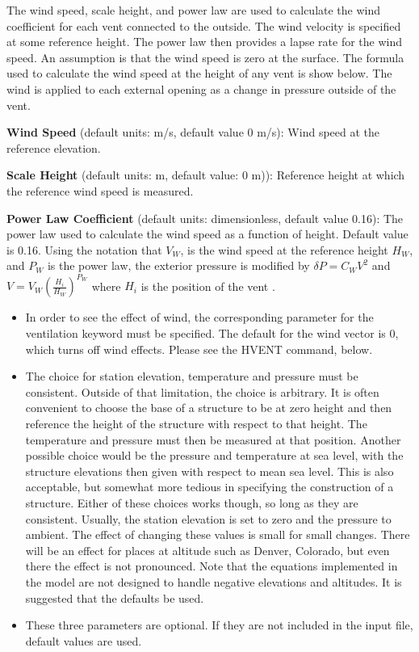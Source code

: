 The wind speed, scale height, and power law are used to calculate the wind coefficient for each vent connected to the outside.  The wind velocity is specified at some reference height.  The power law then provides a lapse rate for the wind speed.  An assumption is that the wind speed is zero at the surface.  The formula used to calculate the wind speed at the height of any vent is show below.  The wind is applied to each external opening as a change in pressure outside of the vent.

\textbf{Wind Speed} (default units: m/s, default value 0 m/s): Wind speed at the reference elevation.

\textbf{Scale Height} (default units: m, default value: 0 m)): Reference height at which the reference wind speed is measured.

\textbf{Power Law Coefficient} (default units: dimensionless, default value 0.16): The power law used to calculate the wind speed as a function of height. Default value is 0.16. Using the notation that $V_W$, is the wind speed at the reference height $H_W$, and $P_W$ is the power law, the exterior pressure is modified by  $\delta P = {C_W}{V^2}$ and $V = {V_W}{\left( {\frac{{{H_i}}}{{{H_W}}}} \right)^{{P_W}}}$ where $H_i$ is the position of the vent \cite{CFAST_Tech_Guide_6}.

\begin{itemize}
\item In order to see the effect of wind, the corresponding parameter for the ventilation keyword must be specified. The default for the wind vector is 0, which turns off wind effects. Please see the HVENT command, below.

\item The choice for station elevation, temperature and pressure must be consistent.  Outside of that limitation, the choice is arbitrary.  It is often convenient to choose the base of a structure to be at zero height and then reference the height of the structure with respect to that height.  The temperature and pressure must then be measured at that position.  Another possible choice would be the pressure and temperature at sea level, with the structure elevations then given with respect to mean sea level.  This is also acceptable, but somewhat more tedious in specifying the construction of a structure.  Either of these choices works though, so long as they are consistent. Usually, the station elevation is set to zero and the pressure to ambient. The effect of changing these values is small for small changes. There will be an effect for places at altitude such as Denver, Colorado, but even there the effect is not pronounced. Note that the equations implemented in the model are not designed to handle negative elevations and altitudes. It is suggested that the defaults be used.

\item These three parameters are optional. If they are not included in the input file, default values are used.
\end{itemize}

